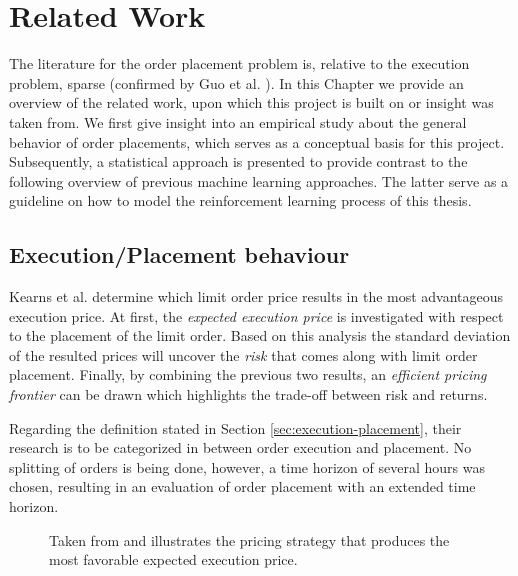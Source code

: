 \chapter{Related Work}
\label{chap:related-work}

The literature for the order placement problem is, relative to the execution problem, sparse (confirmed by Guo et al. \cite{guo2013optimal}).
In this Chapter we provide an overview of the related work, upon which this project is built on or insight was taken from.
We first give insight into an empirical study about the general behavior of order placements, which serves as a conceptual basis for this project.
Subsequently, a statistical approach is presented to provide contrast to the following overview of previous machine learning approaches.
The latter serve as a guideline on how to model the reinforcement learning process of this thesis.

\section{Execution/Placement behaviour}
\label{sec:related-execution-behaviour}

Kearns et al. \cite{nevmyvaka2005electronic} determine which limit order price results in the most advantageous execution price.
At first, the \textit{expected execution price} is investigated with respect to the placement of the limit order. 
Based on this analysis the standard deviation of the resulted prices will uncover the \textit{risk} that comes along with limit order placement. 
Finally, by combining the previous two results, an \textit{efficient pricing frontier} can be drawn which highlights the trade-off between risk and returns.

Regarding the definition stated in Section \ref{sec:execution-placement}, their research is to be categorized in between order execution and placement.
No splitting of orders is being done, however, a time horizon of several hours was chosen, resulting in an evaluation of order placement with an extended time horizon.

\begin{figure}[H]
    \centering
    \caption{Taken from \cite{nevmyvaka2005electronic} and illustrates the pricing strategy that produces the most favorable expected execution price.}
    \label{fig:kearns-return}
\end{figure}

